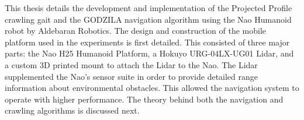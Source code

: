 {}
{
This thesis details the development and implementation of the Projected Profile
crawling gait and the GODZILA navigation algorithm using the Nao Humanoid
robot by Aldebaran Robotics.
The design and construction of the mobile platform used in the experiments is 
first detailed. This consisted of three major parts: the Nao H25 Humanoid
Platform, a Hokuyo URG-04LX-UG01 Lidar, and a custom 3D printed mount to
attach the Lidar to the Nao.
The Lidar supplemented the Nao's sensor suite in order to provide detailed
range information about environmental obstacles. This allowed the navigation
system to operate with higher performance. 
The theory behind both the navigation and crawling algorithms is discussed
next. 
 
 

 


\clearpage}
{\endmsabstract}
